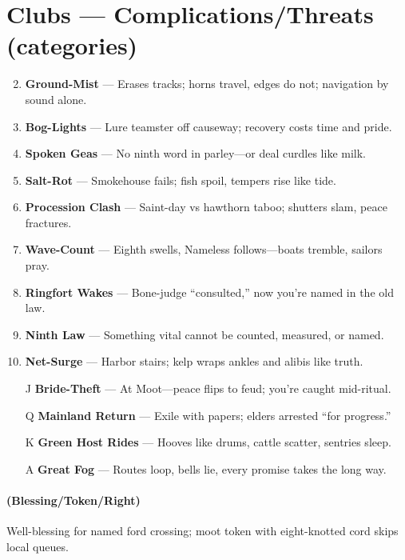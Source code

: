 \section*{Clubs --- Complications/Threats (categories)}
\label{sec:theona-complications}
\begin{enumerate}
\setcounter{enumi}{1}
\item \textbf{Ground-Mist} --- Erases tracks; horns travel, edges do not; navigation by sound alone.
\item \textbf{Bog-Lights} --- Lure teamster off causeway; recovery costs time and pride.
\item \textbf{Spoken Geas} --- No ninth word in parley---or deal curdles like milk.
\item \textbf{Salt-Rot} --- Smokehouse fails; fish spoil, tempers rise like tide.
\item \textbf{Procession Clash} --- Saint-day vs hawthorn taboo; shutters slam, peace fractures.
\item \textbf{Wave-Count} --- Eighth swells, Nameless follows---boats tremble, sailors pray.
\item \textbf{Ringfort Wakes} --- Bone-judge ``consulted,'' now you're named in the old law.
\item \textbf{Ninth Law} --- Something vital cannot be counted, measured, or named.
\item \textbf{Net-Surge} --- Harbor stairs; kelp wraps ankles and alibis like truth.
\item[J] \textbf{Bride-Theft} --- At Moot---peace flips to feud; you're caught mid-ritual.
\item[Q] \textbf{Mainland Return} --- Exile with papers; elders arrested ``for progress.''
\item[K] \textbf{Green Host Rides} --- Hooves like drums, cattle scatter, sentries sleep.
\item[A] \textbf{Great Fog} --- Routes loop, bells lie, every promise takes the long way.
\end{enumerate}

\paragraph*{(Blessing/Token/Right)} Well-blessing for named ford crossing; moot token with eight-knotted cord skips local queues.

